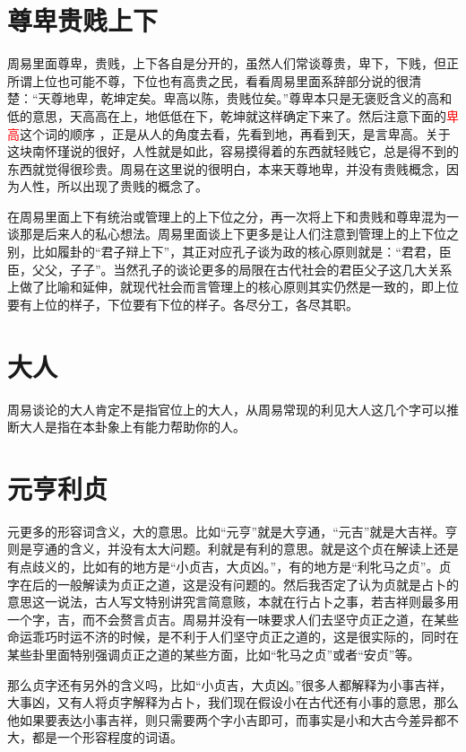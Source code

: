 \documentclass[12pt,oneside]{book}
\renewcommand{\emph}[1]{\textcolor{red}{#1}}
\begin{document}
\section{尊卑贵贱上下}
周易里面尊卑，贵贱，上下各自是分开的，虽然人们常谈尊贵，卑下，下贱，但正所谓上位也可能不尊，下位也有高贵之民，看看周易里面系辞部分说的很清楚：“天尊地卑，乾坤定矣。卑高以陈，贵贱位矣。”尊卑本只是无褒贬含义的高和低的意思，天高高在上，地低低在下，乾坤就这样确定下来了。然后注意下面的\emph{卑高}这个词的顺序 ，正是从人的角度去看，先看到地，再看到天，是言卑高。关于这块南怀瑾说的很好，人性就是如此，容易摸得着的东西就轻贱它，总是得不到的东西就觉得很珍贵。周易在这里说的很明白，本来天尊地卑，并没有贵贱概念，因为人性，所以出现了贵贱的概念了。

在周易里面上下有统治或管理上的上下位之分，再一次将上下和贵贱和尊卑混为一谈那是后来人的私心想法。周易里面谈上下更多是让人们注意到管理上的上下位之别，比如履卦的“君子辩上下”，其正对应孔子谈为政的核心原则就是：“君君，臣臣，父父，子子”。当然孔子的谈论更多的局限在古代社会的君臣父子这几大关系上做了比喻和延伸，就现代社会而言管理上的核心原则其实仍然是一致的，即上位要有上位的样子，下位要有下位的样子。各尽分工，各尽其职。

\section{大人}
周易谈论的大人肯定不是指官位上的大人，从周易常现的利见大人这几个字可以推断大人是指在本卦象上有能力帮助你的人。

\section{元亨利贞}
元更多的形容词含义，大的意思。比如“元亨”就是大亨通，“元吉”就是大吉祥。亨则是亨通的含义，并没有太大问题。利就是有利的意思。就是这个贞在解读上还是有点歧义的，比如有的地方是“小贞吉，大贞凶。”，有的地方是“利牝马之贞”。贞字在后的一般解读为贞正之道，这是没有问题的。然后我否定了认为贞就是占卜的意思这一说法，古人写文特别讲究言简意赅，本就在行占卜之事，若吉祥则最多用一个字，吉，而不会赘言贞吉。周易并没有一味要求人们去坚守贞正之道，在某些命运乖巧时运不济的时候，是不利于人们坚守贞正之道的，这是很实际的，同时在某些卦里面特别强调贞正之道的某些方面，比如“牝马之贞”或者“安贞”等。

那么贞字还有另外的含义吗，比如“小贞吉，大贞凶。”很多人都解释为小事吉祥，大事凶，又有人将贞字解释为占卜，我们现在假设小在古代还有小事的意思，那么他如果要表达小事吉祥，则只需要两个字小吉即可，而事实是小和大古今差异都不大，都是一个形容程度的词语。
\end{document}
